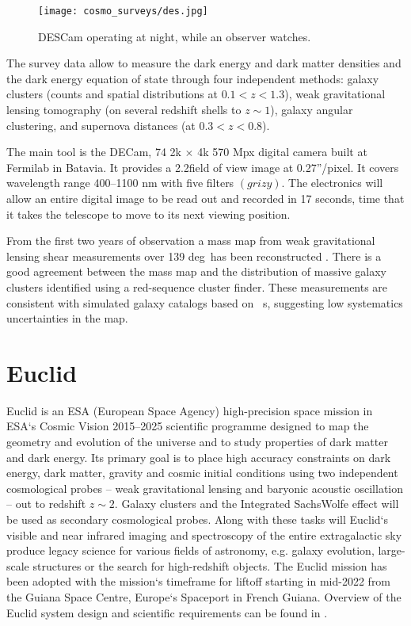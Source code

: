 \begin{figure}[ht]
    \centering
    \texttt{[image: cosmo\_surveys/des.jpg]}
    \caption{DESCam operating at night, while an observer watches.}
    \label{fig:des}
\end{figure}
The survey data allow to measure the dark energy and dark matter densities and the dark energy equation of state through four independent methods: galaxy clusters (counts and spatial distributions at $0.1<z<1.3$), weak gravitational lensing tomography (on several redshift shells to $z\sim1$), galaxy angular clustering, and supernova distances (at $0.3<z<0.8$).

The main tool is the DECam, 74 2k $\times$ 4k 570 Mpx digital camera built at Fermilab in Batavia. It provides a 2.2\textdegree field of view image at 0.27''/pixel. It covers wavelength range 400--1100 nm with five filters $(grizy)$. The electronics will allow an entire digital image to be read out and recorded in 17 seconds, time that it takes the telescope to move to its next viewing position.

From the first two years of observation a mass map from weak gravitational lensing shear measurements over 139 deg\sq\ has been reconstructed \cite{DES_mass}. There is a good agreement between the mass map and the distribution of massive galaxy clusters identified using a red-sequence cluster finder. These measurements are consistent with simulated galaxy catalogs based on \LCDM\ \nbody s, suggesting low systematics uncertainties in the map.


\section{Euclid}
Euclid is an ESA (European Space Agency) high-precision space mission in ESA`s Cosmic Vision 2015--2025 scientific programme designed to map the geometry and evolution of the universe and to study properties of dark matter and dark energy. Its primary goal is to place high accuracy constraints on dark energy, dark matter, gravity and cosmic initial conditions using two independent cosmological probes -- weak gravitational lensing and baryonic acoustic oscillation -- out to redshift $z\sim2$. Galaxy clusters and the Integrated SachsWolfe effect will be used as secondary cosmological probes. Along with these tasks will Euclid`s visible and near infrared imaging and spectroscopy of the entire extragalactic sky produce legacy science for various fields of astronomy, e.g. galaxy evolution, large-scale structures or the search for high-redshift objects. The Euclid mission has been adopted with the mission`s timeframe for liftoff starting in mid-2022 from the Guiana Space Centre, Europe`s Spaceport in French Guiana. Overview of the Euclid system design and scientific requirements can be found in \cite{2011arXiv1110.3193L}.

